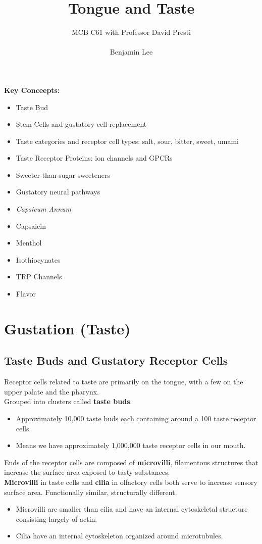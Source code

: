 \documentclass{article}
\title{Tongue and Taste}
\author{MCB C61 with Professor David Presti \\ \\ Benjamin Lee}
\begin{document}
\maketitle

\textbf{Key Conceepts:}
\begin{itemize}
    \item Taste Bud
    \item Stem Cells and gustatory cell replacement
    \item Taste categories and receptor cell types: salt, sour, bitter, sweet, umami
    \item Taste Receptor Proteins: ion channels and GPCRs
    \item Sweeter-than-sugar sweeteners
    \item Gustatory neural pathways
    \item \textit{Capsicum Annum}
    \item Capsaicin 
    \item Menthol 
    \item Isothiocynates
    \item TRP Channels
    \item Flavor
\end{itemize}
\newpage


\section{Gustation (Taste)}
\subsection{Taste Buds and Gustatory Receptor Cells}
Receptor cells related to taste are primarily on the tongue, with a few on the upper palate and the pharynx. \\
Grouped into clusters called \textbf{taste buds}. 
\begin{itemize}
    \item Approximately 10,000 taste buds each containing around a 100 taste receptor cells.
    \item Means we have approximately 1,000,000 taste receptor  cells in our mouth.
\end{itemize}

\noindent Ends of the receptor cells are composed of \textbf{microvilli}, filamentous structures that increase the surface area exposed to tasty substances. \\

\noindent \textbf{Microvilli} in taste cells and \textbf{cilia} in olfactory cells both serve to increase sensory surface area. Functionally similar, structurally different. 
\begin{itemize}
    \item Microvilli are smaller than cilia and have an internal cytoskeletal structure consisting largely of actin.
    \item Cilia have an internal cytoskeleton organized around microtubules. 
\end{itemize}
\end{document}
